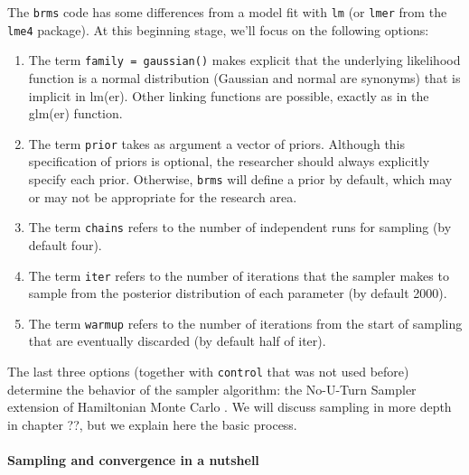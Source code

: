 \documentclass[12pt,]{krantz}
\providecommand{\tightlist}{%
  \setlength{\itemsep}{0pt}\setlength{\parskip}{0pt}}
\let\oldparagraph\paragraph
\renewcommand{\paragraph}[1]{\oldparagraph{#1}\mbox{}}
\theoremstyle{definition}
\theoremstyle{definition}
\theoremstyle{definition}
\theoremstyle{remark}
\begin{document}
The \texttt{brms} code has some differences from a model fit with \texttt{lm} (or \texttt{lmer} from the \texttt{lme4} package). At this beginning stage, we'll focus on the following options:

\begin{enumerate}
\def\labelenumi{\arabic{enumi}.}
\tightlist
\item
  The term \texttt{family\ =\ gaussian()} makes explicit that the underlying likelihood function is a normal distribution (Gaussian and normal are synonyms) that is implicit in lm(er). Other linking functions are possible, exactly as in the glm(er) function.
\item
  The term \texttt{prior} takes as argument a vector of priors. Although this specification of priors is optional, the researcher should always explicitly specify each prior. Otherwise, \texttt{brms} will define a prior by default, which may or may not be appropriate for the research area.
\item
  The term \texttt{chains} refers to the number of independent runs for sampling (by default four).
\item
  The term \texttt{iter} refers to the number of iterations that the sampler makes to sample from the posterior distribution of each parameter (by default 2000).
\item
  The term \texttt{warmup} refers to the number of iterations from the start of sampling that are eventually discarded (by default half of iter).
\end{enumerate}

The last three options (together with \texttt{control} that was not used before) determine the behavior of the sampler algorithm: the No-U-Turn Sampler \citep[NUTS;][]{hoffmanNoUTurnSamplerAdaptively2014} extension of Hamiltonian Monte Carlo \citep{duaneHybridMonteCarlo1987, nealMCMCUsingHamiltonian2011}. We will discuss sampling in more depth in chapter ??, but we explain here the basic process.

\hypertarget{sampling-and-convergence-in-a-nutshell}{%
\paragraph{Sampling and convergence in a nutshell}\label{sampling-and-convergence-in-a-nutshell}}
\end{document}
